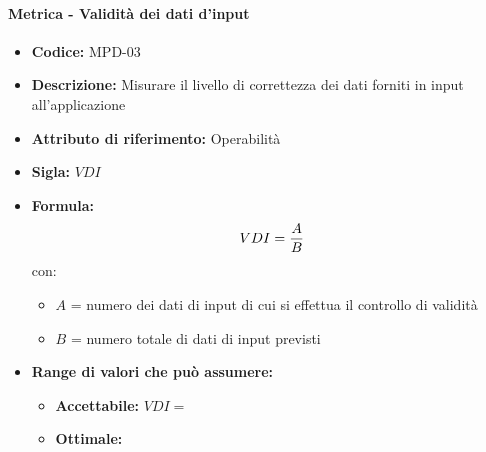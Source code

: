	 \paragraph{Metrica - Validità dei dati d'input} 
	    \begin{itemize}
          \item  \textbf{Codice: } MPD-03
           \item \textbf{Descrizione:} Misurare il livello di correttezza dei dati forniti in input all'applicazione
         \item   \textbf{Attributo di riferimento:} Operabilità
          \item  \textbf{Sigla:} $VDI$
         \item   \textbf{Formula:} $$VDI = {A \over B}$$
            con:
            \begin{itemize}
                \item $A$ = numero dei dati di input di cui si effettua il controllo di validità 
                \item $B$ = numero totale di dati di input previsti
            \end{itemize}
             
        \item \textbf{Range di valori che può assumere:}
        \begin{itemize}
            \item \textbf{Accettabile:} $VDI = $
            \item \textbf{Ottimale:} 
        \end{itemize}
       \end{itemize}
              
                
